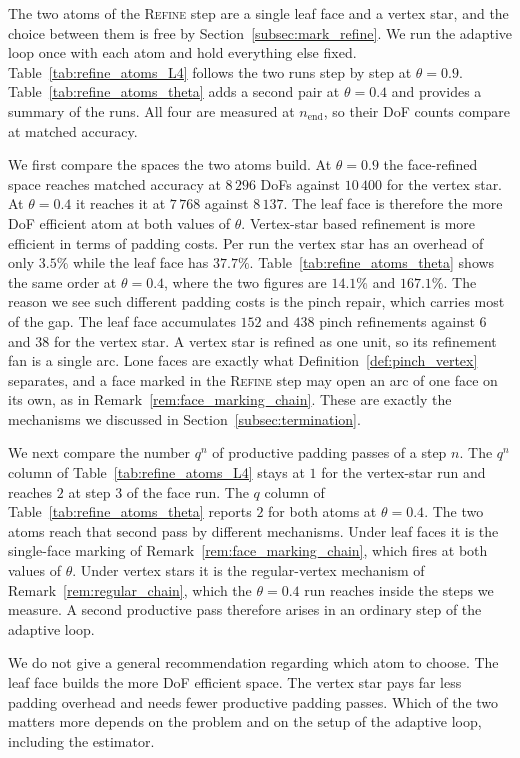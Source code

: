 \documentclass[a4paper, 12pt]{article}
\newcommand{\laststep}{{n_{\mathrm{end}}}}                      %
\newcommand{\totalDoFs}[1]{N\!\left(#1\right)}
\theoremstyle{definition}
\theoremstyle{plain}
\numberwithin{equation}{section}
\begin{document}
The two atoms of the \textsc{Refine} step are a single leaf face and a vertex star, and the choice between them is free by Section~\ref{subsec:mark_refine}. We run the adaptive loop once with each atom and hold everything else fixed. Table~\ref{tab:refine_atoms_L4} follows the two runs step by step at $\theta = 0.9$. Table~\ref{tab:refine_atoms_theta} adds a second pair at $\theta = 0.4$ and provides a summary of the runs. All four are measured at $\laststep$, so their DoF counts compare at matched accuracy.

We first compare the spaces the two atoms build. At $\theta = 0.9$ the face-refined space reaches matched accuracy at $8\,296$ DoFs against $10\,400$ for the vertex star. At $\theta = 0.4$ it reaches it at $7\,768$ against $8\,137$. The leaf face is therefore the more DoF efficient atom at both values of $\theta$.
Vertex-star based refinement is more efficient in terms of padding costs. Per run the vertex star has an overhead of only $3.5\%$ while the leaf face has $37.7\%$. Table~\ref{tab:refine_atoms_theta} shows the same order at $\theta = 0.4$, where the two figures are $14.1\%$ and $167.1\%$. The reason we see such different padding costs is the pinch repair, which carries most of the gap. The leaf face accumulates $152$ and $438$ pinch refinements against $6$ and $38$ for the vertex star. A vertex star is refined as one unit, so its refinement fan is a single arc. Lone faces are exactly what Definition~\ref{def:pinch_vertex} separates, and a face marked in the \textsc{Refine} step may open an arc of one face on its own, as in Remark~\ref{rem:face_marking_chain}. These are exactly the mechanisms we discussed in Section~\ref{subsec:termination}.

We next compare the number $q^n$ of productive padding passes of a step $n$. The $q^n$ column of Table~\ref{tab:refine_atoms_L4} stays at $1$ for the vertex-star run and reaches $2$ at step $3$ of the face run. The $q$ column of Table~\ref{tab:refine_atoms_theta} reports $2$ for both atoms at $\theta = 0.4$. The two atoms reach that second pass by different mechanisms. Under leaf faces it is the single-face marking of Remark~\ref{rem:face_marking_chain}, which fires at both values of $\theta$. Under vertex stars it is the regular-vertex mechanism of Remark~\ref{rem:regular_chain}, which the $\theta = 0.4$ run reaches inside the steps we measure. A second productive pass therefore arises in an ordinary step of the adaptive loop.

We do not give a general recommendation regarding which atom to choose. The leaf face builds the more DoF efficient space. The vertex star pays far less padding overhead and needs fewer productive padding passes. Which of the two matters more depends on the problem and on the setup of the adaptive loop, including the estimator.
\end{document}
